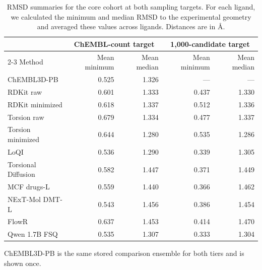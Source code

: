 \begin{table}[htbp]
\centering
\small
\setlength{\tabcolsep}{5pt}
\caption{RMSD summaries for the core cohort at both sampling targets. For each
ligand, we calculated the minimum and median RMSD to the experimental geometry
and averaged these values across ligands. Distances are in \AA{}.}
\label{tab:supporting-rmsd}
\begin{tabular}{lrrrr}
\hline
& \multicolumn{2}{c}{ChEMBL-count target} & \multicolumn{2}{c}{1,000-candidate target} \\
\cline{2-3}\cline{4-5}
Method & Mean minimum & Mean median & Mean minimum & Mean median \\
\hline
ChEMBL3D-PB & 0.525 & 1.326 & --- & --- \\
RDKit raw & 0.601 & 1.333 & 0.437 & 1.330 \\
RDKit minimized & 0.618 & 1.337 & 0.512 & 1.336 \\
Torsion raw & 0.679 & 1.334 & 0.477 & 1.337 \\
Torsion minimized & 0.644 & 1.280 & 0.535 & 1.286 \\
LoQI & 0.536 & 1.290 & 0.339 & 1.305 \\
Torsional Diffusion & 0.582 & 1.447 & 0.371 & 1.449 \\
MCF drugs-L & 0.559 & 1.440 & 0.366 & 1.462 \\
NExT-Mol DMT-L & 0.543 & 1.456 & 0.386 & 1.454 \\
FlowR & 0.637 & 1.453 & 0.414 & 1.470 \\
Qwen 1.7B FSQ & 0.535 & 1.307 & 0.333 & 1.304 \\
\hline
\end{tabular}
\par\smallskip
\begin{minipage}{\linewidth}
\footnotesize ChEMBL3D-PB is the same stored comparison ensemble for both tiers
and is shown once.
\end{minipage}
\end{table}

